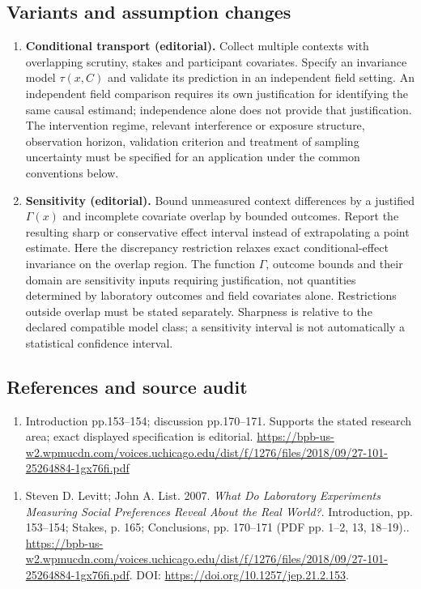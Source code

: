 \documentclass[11pt,a4paper]{article}
\begin{document}
\subsection*{Variants and assumption changes}
\begin{enumerate}
\item \textbf{Conditional transport (editorial).} Collect multiple contexts with overlapping scrutiny, stakes and participant covariates. Specify an invariance model \(\tau(x,C)\) and validate its prediction in an independent field setting. An independent field comparison requires its own justification for identifying the same causal estimand; independence alone does not provide that justification. The intervention regime, relevant interference or exposure structure, observation horizon, validation criterion and treatment of sampling uncertainty must be specified for an application under the common conventions below.
\item \textbf{Sensitivity (editorial).} Bound unmeasured context differences by a justified \(\Gamma(x)\) and incomplete covariate overlap by bounded outcomes. Report the resulting sharp or conservative effect interval instead of extrapolating a point estimate. Here the discrepancy restriction relaxes exact conditional-effect invariance on the overlap region. The function \(\Gamma\), outcome bounds and their domain are sensitivity inputs requiring justification, not quantities determined by laboratory outcomes and field covariates alone. Restrictions outside overlap must be stated separately. Sharpness is relative to the declared compatible model class; a sensitivity interval is not automatically a statistical confidence interval.
\end{enumerate}
\subsection*{References and source audit}
\begin{enumerate}
\item Introduction pp.153–154; discussion pp.170–171. Supports the stated research area; exact displayed specification is editorial. \url{https://bpb-us-w2.wpmucdn.com/voices.uchicago.edu/dist/f/1276/files/2018/09/27-101-25264884-1gx76fi.pdf}
\end{enumerate}
\begin{enumerate}\raggedright
\item\hypertarget{definitions:source:30007588:1}{} Steven D. Levitt; John A. List. 2007. \emph{What Do Laboratory Experiments Measuring Social Preferences Reveal About the Real World?}. Introduction, pp. 153–154; Stakes, p. 165; Conclusions, pp. 170–171 (PDF pp. 1–2, 13, 18–19)..
\url{https://bpb-us-w2.wpmucdn.com/voices.uchicago.edu/dist/f/1276/files/2018/09/27-101-25264884-1gx76fi.pdf}.
DOI: \url{https://doi.org/10.1257/jep.21.2.153}.
\end{enumerate}
\end{document}
